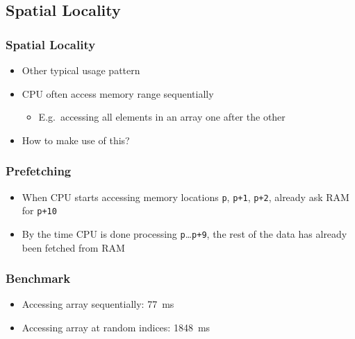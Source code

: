 \subsection{Spatial Locality}

\frame{\tableofcontents[currentsubsection]}

\begin{frame}
  \frametitle{Spatial Locality}
  \begin{itemize}
    \item Other typical usage pattern
    \item CPU often access memory range sequentially
          \begin{itemize}
            \item E.g.~accessing all elements in an array one after the other
          \end{itemize}
    \item How to make use of this?
  \end{itemize}
\end{frame}

\begin{frame}
  \frametitle{Prefetching}
  \begin{itemize}
    \item When CPU starts accessing memory locations \texttt{p}, \texttt{p+1}, \texttt{p+2},
          already ask RAM for \texttt{p+10}
    \item By the time CPU is done processing \texttt{p}\dots\texttt{p+9}, the rest of the
          data has already been fetched from RAM
  \end{itemize}
\end{frame}

\begin{frame}
  \frametitle{Benchmark}
  \begin{itemize}
    \item Accessing array sequentially: \SI{77}{\milli\second}
    \item Accessing array at random indices: \SI{1848}{\milli\second}
  \end{itemize}
\end{frame}


